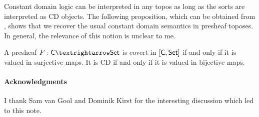 \documentclass[a4paper,12pt]{article}
\begin{document}
Constant domain logic can be interpreted in any topos as long as the sorts are interpreted as CD objects. The following proposition, which can be obtained from \cite[Lem.~C3.2.4]{Johnstone2002v2}, shows that we recover the usual constant domain semantics in presheaf toposes. In general, the relevance of this notion is unclear to me.

\begin{prop}{}{}
	A presheaf $F : \cC → \cSet$ is covert in $[\mathsf{C},\mathsf{Set}]$ if and only if it is valued in surjective maps. It is CD if and only if it is valued in bijective maps.
\end{prop}

\paragraph{Acknowledgments} I thank Sam van Gool and Dominik Kirst for the interesting discussion which led to this note.

\end{document}
